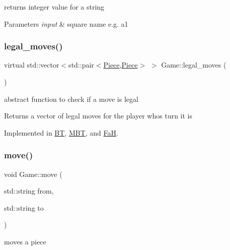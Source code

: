 returns integer value for a string 


\begin{DoxyParams}{Parameters}
{\em input} & square name e.\+g. a1 \\
\hline
\end{DoxyParams}
\mbox{\label{class_game_a205fc7dd195bc398138cc188aad8bc38}} 
\subsubsection{\texorpdfstring{legal\+\_\+moves()}{legal\_moves()}}
{\footnotesize\ttfamily virtual std\+::vector$<$std\+::pair$<$\hyperlink{class_piece}{Piece},\hyperlink{class_piece}{Piece}$>$ $>$ Game\+::legal\+\_\+moves (\begin{DoxyParamCaption}{ }\end{DoxyParamCaption})\hspace{0.3cm}{\ttfamily [pure virtual]}}



abstract function to check if a move is legal 

\begin{DoxyReturn}{Returns}
a vector of legal moves for the player whos turn it is 
\end{DoxyReturn}


Implemented in \hyperlink{class_b_t_a4d3ad59ecb429b37c983986cc7802b17}{BT}, \hyperlink{class_m_b_t_add9f32f140d4c6fb5e160eadeddd6738}{M\+BT}, and \hyperlink{class_fa_h_a6bf4d1735a23a2cf51cfe905c4f437a8}{FaH}.

\mbox{\label{class_game_a00150c33b3469c2fb95653b2f3be36b6}} 
\subsubsection{\texorpdfstring{move()}{move()}}
{\footnotesize\ttfamily void Game\+::move (\begin{DoxyParamCaption}\item[{std\+::string}]{from,  }\item[{std\+::string}]{to }\end{DoxyParamCaption})}



moves a piece 


